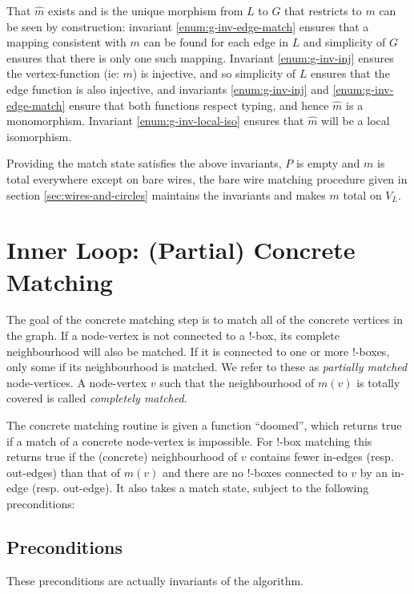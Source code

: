 \documentclass{article}
\begin{document}
That $\hat m$ exists and is the unique morphism from $L$ to $G$ that restricts to $m$ can be seen by construction: invariant \ref{enum:g-inv-edge-match} ensures that a mapping consistent with $m$ can be found for each edge in $L$ and simplicity of $G$ ensures that there is only one such mapping.  Invariant \ref{enum:g-inv-inj} ensures the vertex-function (ie: $m$) is injective, and so simplicity of $L$ ensures that the edge function is also injective, and invariants \ref{enum:g-inv-inj} and \ref{enum:g-inv-edge-match} ensure that both functions respect typing, and hence $\hat m$ is a monomorphism.  Invariant \ref{enum:g-inv-local-iso} ensures that $\hat m$ will be a local isomorphism.

Providing the match state satisfies the above invariants, $P$ is empty and $m$ is total everywhere except on bare wires, the bare wire matching procedure given in section \ref{sec:wires-and-circles} maintains the invariants and makes $m$ total on $V_L$.


\section{Inner Loop: (Partial) Concrete Matching}
\label{sec:inner-loop}

The goal of the concrete matching step is to match all of the concrete vertices in the graph. If a node-vertex is not connected to a !-box, its complete neighbourhood will also be matched. If it is connected to one or more !-boxes, only some if its neighbourhood is matched. We refer to these as \textit{partially matched} node-vertices. A node-vertex $v$ such that the neighbourhood of $m(v)$ is totally covered is called \textit{completely matched}.

The concrete matching routine is given a function ``doomed'', which returns true if a match of a concrete node-vertex is impossible. For !-box matching this returns true if the (concrete) neighbourhood of $v$ contains fewer in-edges (resp. out-edges) than that of $m(v)$ and there are no !-boxes connected to $v$ by an in-edge (resp. out-edge). It also takes a match state, subject to the following preconditions:

\subsection{Preconditions}
\label{sec:il-precond}

These preconditions are actually invariants of the algorithm.
\end{document}
